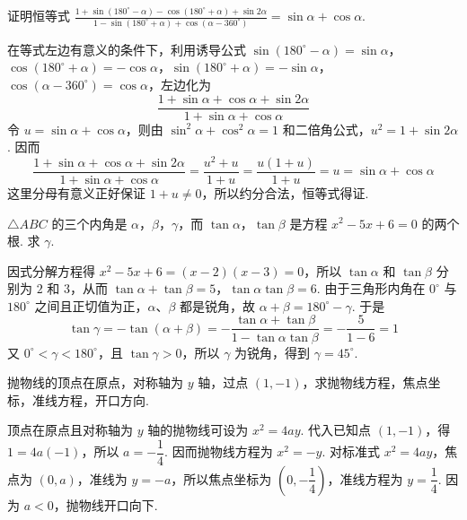 \begin{problem}
证明恒等式 \( \frac{1+\sin(180^\circ-\alpha)-\cos(180^\circ+\alpha)+\sin2\alpha}{1-\sin(180^\circ+\alpha)+\cos(\alpha-360^\circ)}=\sin\alpha+\cos\alpha \).
\end{problem}

\begin{solution}
在等式左边有意义的条件下，利用诱导公式
\(\sin(180^\circ-\alpha)=\sin\alpha\)，\(\cos(180^\circ+\alpha)=-\cos\alpha\)，\(\sin(180^\circ+\alpha)=-\sin\alpha\)，\(\cos(\alpha-360^\circ)=\cos\alpha\)，左边化为
\[
\frac{1+\sin\alpha+\cos\alpha+\sin2\alpha}{1+\sin\alpha+\cos\alpha}
\]
令 \(u=\sin\alpha+\cos\alpha\)，则由 \(\sin^2\alpha+\cos^2\alpha=1\) 和二倍角公式，\(u^2=1+\sin2\alpha\). 因而
\[
\frac{1+\sin\alpha+\cos\alpha+\sin2\alpha}{1+\sin\alpha+\cos\alpha}
=\frac{u^2+u}{1+u}=\frac{u(1+u)}{1+u}=u=\sin\alpha+\cos\alpha
\]
这里分母有意义正好保证 \(1+u\ne0\)，所以约分合法，恒等式得证.
\end{solution}

\begin{problem}
\(\triangle ABC\) 的三个内角是 \(\alpha\)，\(\beta\)，\(\gamma\)，而 \(\tan\alpha\)，\(\tan\beta\) 是方程 \(x^2-5x+6=0\) 的两个根. 求 \(\gamma\).
\end{problem}

\begin{solution}
因式分解方程得 \(x^2-5x+6=(x-2)(x-3)=0\)，所以 \(\tan\alpha\) 和 \(\tan\beta\) 分别为 \(2\) 和 \(3\)，从而 \(\tan\alpha+\tan\beta=5\)，\(\tan\alpha\tan\beta=6\). 由于三角形内角在 \(0^\circ\) 与 \(180^\circ\) 之间且正切值为正，\(\alpha\)、\(\beta\) 都是锐角，故 \(\alpha+\beta=180^\circ-\gamma\). 于是
\[
\tan\gamma=-\tan(\alpha+\beta)=-\frac{\tan\alpha+\tan\beta}{1-\tan\alpha\tan\beta}=-\frac{5}{1-6}=1
\]
又 \(0^\circ<\gamma<180^\circ\)，且 \(\tan\gamma>0\)，所以 \(\gamma\) 为锐角，得到 \(\gamma=45^\circ\).
\end{solution}

\begin{problem}
抛物线的顶点在原点，对称轴为 \(y\) 轴，过点 \((1,-1)\)，求抛物线方程，焦点坐标，准线方程，开口方向.
\end{problem}

\begin{solution}
顶点在原点且对称轴为 \(y\) 轴的抛物线可设为 \(x^2=4ay\). 代入已知点 \((1,-1)\)，得 \(1=4a(-1)\)，所以 \(a=-\dfrac{1}{4}\). 因而抛物线方程为 \(x^2=-y\). 对标准式 \(x^2=4ay\)，焦点为 \((0,a)\)，准线为 \(y=-a\)，所以焦点坐标为 \(\left(0,-\dfrac{1}{4}\right)\)，准线方程为 \(y=\dfrac{1}{4}\). 因为 \(a<0\)，抛物线开口向下.
\end{solution}

